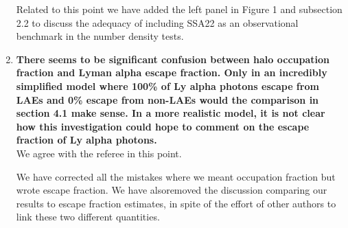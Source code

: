 \documentclass[12pts]{article}
\begin{document}
\begin{enumerate}
Related to this point we have added the left panel in Figure 1 and
subsection 2.2 to discuss the adequacy of including SSA22 as an
observational benchmark in the number density tests.


\item {\bf 
  There seems to be significant confusion between halo occupation
   fraction and Lyman alpha escape fraction.  Only in an incredibly
   simplified model where 100\% of Ly alpha photons escape from LAEs
   and 0\% escape from non-LAEs would the comparison in section 4.1
   make sense.  In a more realistic model, it is not clear how this
   investigation could hope to comment on the escape fraction of Ly
   alpha photons. 
}\\

We agree with the referee in this point.

We have corrected all the mistakes where we meant occupation
fraction but wrote escape fraction. We have alsoremoved the discussion
comparing our results to escape fraction estimates, in spite of the
effort of other authors to link these two different quantities.  

\end{enumerate}
\end{document}

